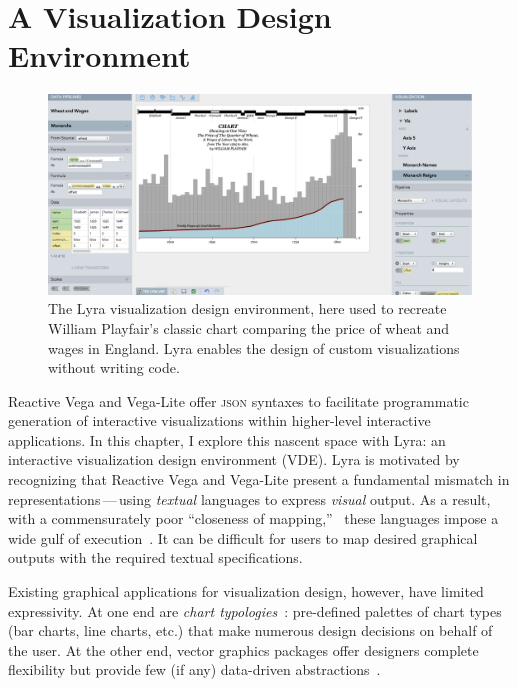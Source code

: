 \graphicspath{{./lyra/figures/}}
\chapter{A Visualization Design Environment}
\label{sec:lyra}

\begin{figure}[h!]
  \vspace{-40pt}
  \centering
  \includegraphics[width=\columnwidth]{playfair}
  \caption{The Lyra visualization design environment, here used to recreate William Playfair's classic chart comparing the price of wheat and wages in England. Lyra enables the design of custom visualizations without writing code.}
  \label{fig:lyra:teaser}
\end{figure}

Reactive Vega and Vega-Lite offer \textsc{json} syntaxes to facilitate
programmatic generation of interactive visualizations within higher-level
interactive applications. In this chapter, I explore this nascent space with
Lyra: an interactive visualization design environment (VDE). Lyra is motivated
by recognizing that Reactive Vega and Vega-Lite present a fundamental mismatch
in representations\,---\,using \emph{textual} languages to express \emph{visual}
output. As a result, with a commensurately poor ``closeness of
mapping,''~\cite{blackwell:cogdim} these languages impose a wide gulf of
execution~\cite{hutchins:directmanip}. It can be difficult for users to map
desired graphical outputs with the required textual specifications.

Existing graphical applications for visualization design, however, have limited
expressivity. At one end are \emph{chart typologies}~\cite{wilkinson:grammar}:
pre-defined palettes of chart types (bar charts, line charts, etc.) that make
numerous design decisions on behalf of the user. At the other end, vector
graphics packages offer designers complete flexibility but provide few (if any)
data-driven abstractions~\cite{bigelow:reflections}.






